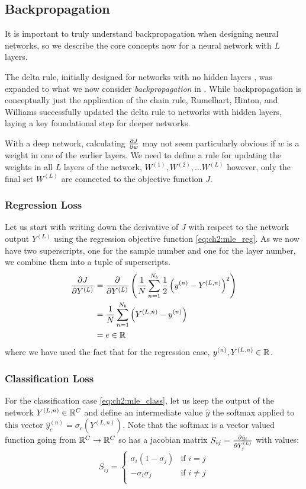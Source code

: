 \subsection{Backpropagation}
It is important to truly understand backpropagation when designing neural
networks, so we describe the core concepts now for a neural network with
$L$ layers.

The delta rule, initially designed for networks with no hidden layers 
\cite{widrow_neurocomputing:_1988}, was expanded to what we now consider
\emph{backpropagation} in \cite{rumelhart_parallel_1986}. While backpropagation
is conceptually just the application of the chain rule, Rumelhart, Hinton, and
Williams successfully updated the delta rule to networks with hidden layers,
laying a key foundational step for deeper networks. 

With a deep network, calculating $\dydx{J}{w}$ may not seem
particularly obvious if $w$ is a weight in one of the earlier layers. We need
to define a rule for updating the weights in all $L$ layers of the network,
$W^{(1)}, W^{(2)}, \ldots W^{(L)}$ however, only the final set $W^{(L)}$ are
connected to the objective function $J$. 

\subsubsection{Regression Loss}
Let us start with writing down the derivative of $J$ with respect to the network
output $Y^{(L)}$ using the regression objective function \eqref{eq:ch2:mle_reg}. 
As we now have two superscripts,
one for the sample number and one for the layer number, we combine them into a
tuple of superscripts. 
\begin{align}
  \dydx{J}{Y^{(L)}} &= \dydx{}{Y^{(L)}} \left( \frac{1}{N}\sum_{n=1}^{N_b}\frac{1}{2} \left(y^{(n)} - Y^{(L, n)}\right)^2\right) \\
                    &= \frac{1}{N}\sum_{n=1}^{N_b} \left(Y^{(L, n)} - y^{(n)} \right) \\
                    &= e \in \reals \label{eq:ch2:reg_b1}
\end{align}
where we have used the fact that for the regression case, $y^{(n)}, Y^{(L,n)}
\in \reals$. 

\subsubsection{Classification Loss}
For the classification case \eqref{eq:ch2:mle_class}, let us keep the output of
the network $Y^{(L,n)} \in \reals[C]$ and define an intermediate value $\hat{y}$ the
softmax applied to this vector $\hat{y}^{(n)}_c = \sigma_c\left(Y^{(L, n)}\right)$.
Note that the softmax is a vector valued function going from $\reals[C] \rightarrow
\reals[C]$ so has a jacobian matrix $S_{ij} = \dydx{\hat{y}_i}{Y^{(L)}_j}$ with
values:
\begin{equation}
  S_{ij} = \begin{cases}
    \sigma_i (1-\sigma_j) & \text{if $i=j$}\\
    -\sigma_i \sigma_j & \text{if $i\neq j$}\\
  \end{cases}
\end{equation}

